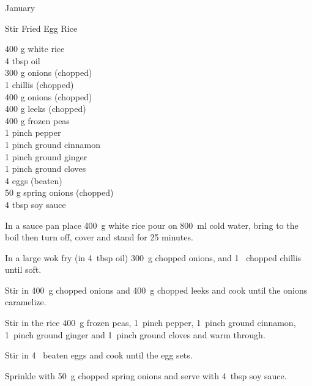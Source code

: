 \begin{menu}{January}
    \begin{recipe}{2}{Stir Fried Egg Rice}%
		\begin{ingredients}
		400 g white rice  \\
	4 tbsp oil  \\
	300 g onions (chopped) \\
	1  chillis (chopped) \\
	400 g onions (chopped) \\
	400 g leeks (chopped) \\
	400 g frozen peas  \\
	1 pinch pepper  \\
	1 pinch ground cinnamon  \\
	1 pinch ground ginger  \\
	1 pinch ground cloves  \\
	4  eggs (beaten) \\
	50 g spring onions (chopped) \\
	4 tbsp soy sauce  \\
	
		\end{ingredients}
	
    \begin{instructions}
    \item 
      In a
      sauce pan
      place
      400~g  white rice
      pour on
      800~ml  cold water,
      bring to the boil then turn off, cover and stand for 25 minutes.
    \item 
        In a large wok fry 
        (in 4~tbsp  oil)
        300~g chopped onions,
        and
        1~ chopped chillis
        until soft.      
      \item 
        Stir in
        400~g chopped onions
        and
        400~g chopped leeks
        and cook until the onions caramelize.      
      \item 
        Stir in the rice
        400~g  frozen peas,
        1~pinch  pepper,
        1~pinch  ground cinnamon,
        1~pinch  ground ginger
        and
        1~pinch  ground cloves
        and warm through.
      \item 
        Stir in
        4~ beaten eggs
        and cook until the egg sets.
      \item 
        Sprinkle with
        50~g chopped spring onions
        and serve with
        4~tbsp  soy sauce.
      
    \end{instructions}
    \end{recipe}%
  

\end{menu}
